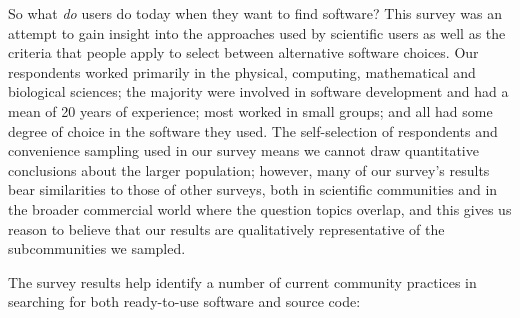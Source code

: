 \documentclass{casicswhitepaper}
\begin{document}
%
%

So what \emph{do} users do today when they want to find software?  This survey was an attempt to gain insight into the approaches used by scientific users as well as the criteria that people apply to select between alternative software choices.  Our respondents worked primarily in the physical, computing, mathematical and biological sciences; the majority were involved in software development and had a mean of 20 years of experience; most worked in small groups; and all had some degree of choice in the software they used.  The self-selection of respondents and convenience sampling used in our survey means we cannot draw quantitative conclusions about the larger population; however, many of our survey's results bear similarities to those of other surveys, both in scientific communities and in the broader commercial world where the question topics overlap, and this gives us reason to believe that our results are qualitatively representative of the subcommunities we sampled.

The survey results help identify a number of current community practices in searching for both ready-to-use software and source code:
\end{document}
